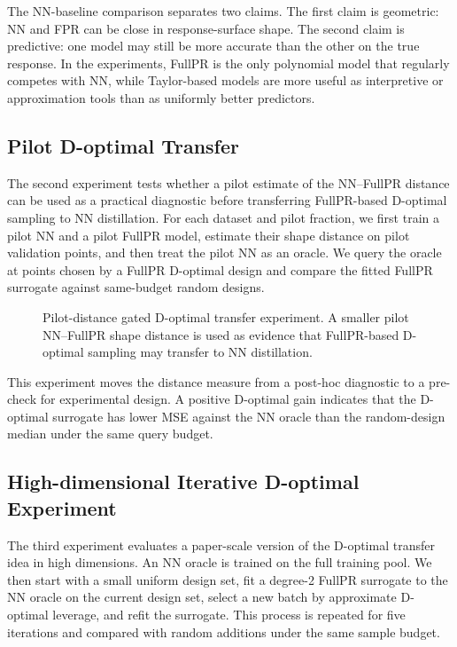 \documentclass[]{interact}
\theoremstyle{plain}
\theoremstyle{definition}
\theoremstyle{remark}
\begin{document}
\FloatBarrier

The NN-baseline comparison separates two claims. The first claim is geometric:
NN and FPR can be close in response-surface shape. The second claim is
predictive: one model may still be more accurate than the other on the true
response. In the experiments, FullPR is the only polynomial model that
regularly competes with NN, while Taylor-based models are more useful as
interpretive or approximation tools than as uniformly better predictors.

\subsection{Pilot D-optimal Transfer}

The second experiment tests whether a pilot estimate of the NN--FullPR distance
can be used as a practical diagnostic before transferring FullPR-based
D-optimal sampling to NN distillation. For each dataset and pilot fraction, we
first train a pilot NN and a pilot FullPR model, estimate their shape distance
on pilot validation points, and then treat the pilot NN as an oracle. We query
the oracle at points chosen by a FullPR D-optimal design and compare the fitted
FullPR surrogate against same-budget random designs.

\begin{figure}[htbp]
\centering
{}
\hfill
{}
\caption{Pilot-distance gated D-optimal transfer experiment. A smaller pilot
NN--FullPR shape distance is used as evidence that FullPR-based D-optimal
sampling may transfer to NN distillation.}
\label{fig:pilot-dopt}
\end{figure}

This experiment moves the distance measure from a post-hoc diagnostic to a
pre-check for experimental design. A positive D-optimal gain indicates that the
D-optimal surrogate has lower MSE against the NN oracle than the random-design
median under the same query budget.

\subsection{High-dimensional Iterative D-optimal Experiment}

The third experiment evaluates a paper-scale version of the D-optimal transfer
idea in high dimensions. An NN oracle is trained on the full training pool. We
then start with a small uniform design set, fit a degree-2 FullPR surrogate to
the NN oracle on the current design set, select a new batch by approximate
D-optimal leverage, and refit the surrogate. This process is repeated for five
iterations and compared with random additions under the same sample budget.
\end{document}
